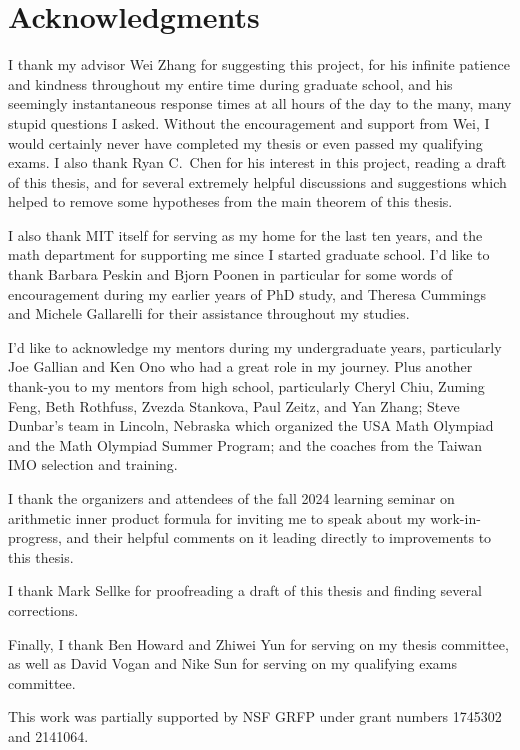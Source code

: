 

\section*{Acknowledgments}

I thank my advisor Wei Zhang for suggesting this project,
for his infinite patience and kindness throughout my entire time during graduate school,
and his seemingly instantaneous response times at all hours of the day
to the many, many stupid questions I asked.
Without the encouragement and support from Wei,
I would certainly never have completed my thesis or even passed my qualifying exams.
I also thank Ryan C.~Chen for his interest in this project,
reading a draft of this thesis, and for several extremely helpful discussions and suggestions
which helped to remove some hypotheses from the main theorem of this thesis.

I also thank MIT itself for serving as my home for the last ten years,
and the math department for supporting me since I started graduate school.
I'd like to thank Barbara Peskin and Bjorn Poonen in particular
for some words of encouragement during my earlier years of PhD study,
and Theresa Cummings and Michele Gallarelli for their assistance throughout my studies.

I'd like to acknowledge my mentors during my undergraduate years,
particularly Joe Gallian and Ken Ono who had a great role in my journey.
Plus another thank-you to my mentors from high school, particularly
Cheryl Chiu, Zuming Feng, Beth Rothfuss, Zvezda Stankova, Paul Zeitz, and Yan Zhang;
Steve Dunbar's team in Lincoln, Nebraska which organized the USA Math Olympiad
and the Math Olympiad Summer Program;
and the coaches from the Taiwan IMO selection and training.

I thank the organizers and attendees of the fall 2024
learning seminar on arithmetic inner product formula
for inviting me to speak about my work-in-progress, and their helpful comments on it
leading directly to improvements to this thesis.

I thank Mark Sellke for proofreading a draft of this thesis
and finding several corrections.

Finally, I thank Ben Howard and Zhiwei Yun for serving on my thesis committee,
as well as David Vogan and Nike Sun for serving on my qualifying exams committee.

This work was partially supported by NSF GRFP under grant numbers 1745302 and 2141064.

